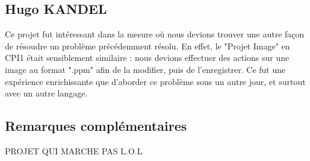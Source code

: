 \documentclass[12pt,a4paper]{article}
\begin{document}
\subsection{Hugo KANDEL}
Ce projet fut intéressant dans la mesure où nous devions trouver une autre façon de résoudre un problème précédemment résolu.\newline
En effet, le "Projet Image" en CPI1 était sensiblement similaire : nous devions effectuer des actions sur une image au format ".ppm" afin de la modifier, puis de l'enregistrer.\newline
Ce fut une expérience enrichissante que d'aborder ce problème sous un autre jour, et surtout avec un autre langage.
\subsection{Remarques complémentaires}
PROJET QUI MARCHE PAS L.O.L
\end{document}
